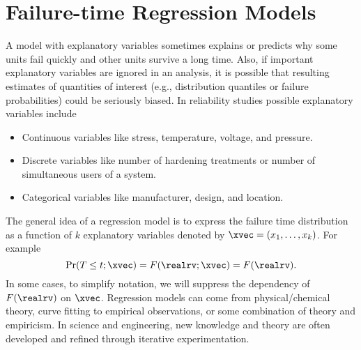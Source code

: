 \section{Failure-time Regression Models}
\label{section:fail.time.regr.models}
A model with explanatory variables sometimes explains or predicts
why some units fail quickly and other units survive a long time. 
Also, if
important explanatory variables are ignored in an analysis, it is
possible that resulting estimates of quantities of interest (e.g.,
distribution quantiles or failure probabilities) could be seriously
biased.  In reliability studies possible explanatory variables include
\begin{itemize} 
\item 
Continuous variables like stress, temperature, voltage, and pressure.
\item
Discrete variables like number of hardening treatments
or number of simultaneous users of a system.
\item 
Categorical variables like manufacturer, design, and location.
\end{itemize}
The general idea of a regression model is to express the failure time
distribution as a function of $k$ explanatory variables
denoted by $\xvec=(x_{1},\ldots,x_{k})$. For example
\begin{displaymath}
\Pr(T \leq t ;\xvec) = F(\realrv;\xvec) = F(\realrv).
\end{displaymath}
In some cases, to simplify notation, we will
suppress the dependency of $F(\realrv)$ on $\xvec$. Regression 
models can come from physical/chemical theory, curve fitting to
empirical observations, or some combination of theory and empiricism.
In science and engineering, new knowledge and theory are 
often developed and refined through iterative experimentation.

